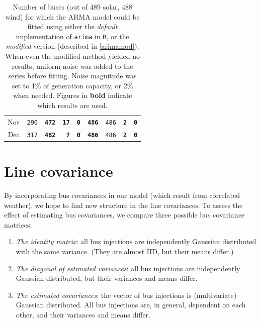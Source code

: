 \documentclass[main.tex]{subfiles}
\begin{document}
\begin{table}[]
\begin{tabular}{c|ccrr|ccrr}
Nov & \texttt{290} & \texttt{\textbf{472}} & \texttt{\textbf{17}} & \texttt{\textbf{0}} & \texttt{\textbf{486}} & \texttt{486} & \texttt{\textbf{2}} & \texttt{\textbf{0}} \\
Dec & \texttt{317} & \texttt{\textbf{482}} & \texttt{\textbf{7}} & \texttt{\textbf{0}} & \texttt{\textbf{486}} & \texttt{486} & \texttt{\textbf{2}} & \texttt{\textbf{0}} \\
\bottomrule
    \end{tabular}%
    \caption{Number of buses (out of 489 solar, 488 wind) for which the ARMA model could be fitted using either the \emph{default} implementation of \texttt{arima} in \texttt{R}, or the \emph{modified} version (described in \ref{arimamod}).
    \newline
    When even the modified method yielded no results, uniform noise was added to the series before fitting. Noise magnitude was set to 1\% of generation capacity, or 2\% when needed.
    \newline
    Figures in \textbf{bold} indicate which results are used.
    }
    \label{tab:arimafitstats}
\end{table}

\section{Line covariance}

By incorporating bus covariances in our model (which result from correlated weather), we hope to find new structure in the line covariances. 
To assess the effect of estimating bus covariances, we compare three possible bus covariance matrices:
\begin{enumerate}
	\item \emph{The identity matrix}: all bus injections are independently Gaussian distributed with the same variance. (They are almost IID, but their means differ.)
	\item \emph{The diagonal of estimated variances}: all bus injections are independently Gaussian distributed, but their variances and means differ.
	\item \emph{The estimated covariances}: the vector of bus injections is (multivariate) Gaussian distributed. All bus injections are, in general, dependent on each other, and their variances and means differ.
\end{enumerate}
\end{document}
